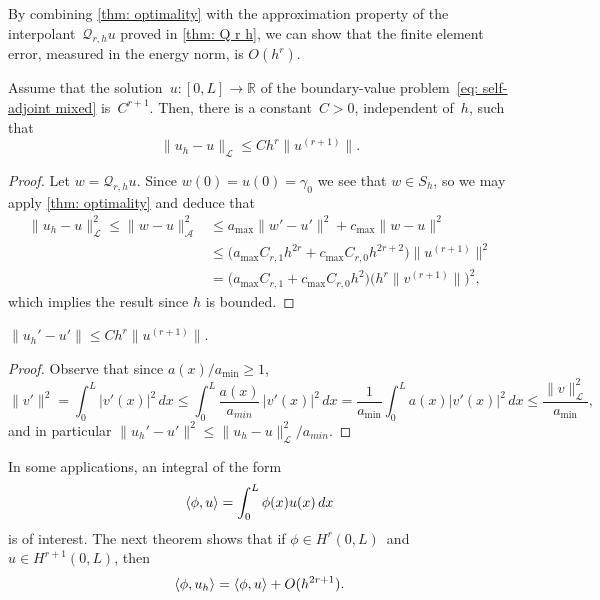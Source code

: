 By combining \cref{thm: optimality} with the approximation property of the 
interpolant~$\mathcal{Q}_{r,h}u$ proved in \cref{thm: Q r h}, we can show
that the finite element error, measured in the energy norm, is $O(h^r)$.

\begin{theorem}\label{thm: uh-u L}
Assume that the solution~$u:[0,L]\to\mathbb{R}$ of the boundary-value 
problem~\eqref{eq: self-adjoint mixed} is~$C^{r+1}$.  Then,
there is a constant~$C>0$, independent of~$h$, such that
\[
\|u_h-u\|_{\mathcal{L}}\le Ch^r\|u^{(r+1)}\|.
\]
\end{theorem}
\begin{proof}
Let $w=\mathcal{Q}_{r,h}u$.  Since $w(0)=u(0)=\gamma_0$ we see that $w\in S_h$,
so we may apply \cref{thm: optimality} and deduce that
\begin{align*}
\|u_h-u\|_{\mathcal{L}}^2\le\|w-u\|_{\mathcal{A}}^2
	&\le a_{\max}\|w'-u'\|^2+c_{\max}\|w-u\|^2\\
	&\le\bigl(a_{\max}C_{r,1}h^{2r}+c_{\max}C_{r,0}h^{2r+2}\bigr)
	\|u^{(r+1)}\|^2\\
	&=\bigl(a_{\max}C_{r,1}+c_{\max}C_{r,0}h^2\bigr)
	\bigl(h^r\|v^{(r+1)}\|\bigr)^2,
\end{align*}
which implies the result since $h$ is bounded.
\end{proof}
\begin{corollary}
$\|u_h'-u'\|\le Ch^r\|u^{(r+1)}\|$.
\end{corollary}
\begin{proof}
Observe that since $a(x)/a_{\min}\ge1$,
\[
\|v'\|^2=\int_0^L|v'(x)|^2\,dx\le\int_0^L\frac{a(x)}{a_{min}}\,|v'(x)|^2\,dx
	=\frac{1}{a_{\min}}\int_0^La(x)|v'(x)|^2\,dx
	\le\frac{\|v\|_{\mathcal{L}}^2}{a_{\min}},
\]
and in particular $\|u_h'-u'\|^2\le\|u_h-u\|^2_{\mathcal{L}}/a_{min}$.
\end{proof}

In some applications, an integral of the form
\[
\langle\phi,u\rangle=\int_0^L\phi(x)u(x)\,dx
\]
is of interest.  The next theorem shows that if $\phi\in H^r(0,L)$~and 
$u\in H^{r+1}(0,L)$, then
\[
\langle\phi,u_h\rangle=\langle\phi,u\rangle+O(h^{2r+1}).
\]

